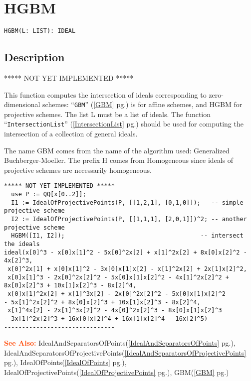 \documentclass[a4paper]{mybook}
\newenvironment{command}{}{} %
\newcommand\SeeAlso{\par\textcolor{OrangeRed}{\textbf{\large See Also: }}}
\begin{document}
\section{HGBM}
\label{HGBM}
\begin{command} %


\begin{Verbatim}[label=syntax, rulecolor=\color{MidnightBlue},
frame=single]
HGBM(L: LIST): IDEAL
\end{Verbatim}


\subsection*{Description}

***** NOT YET IMPLEMENTED *****
\par 
This function computes the intersection of ideals corresponding to
zero-dimensional schemes: ``\verb&GBM&'' (\ref{GBM} pg.\pageref{GBM}) is for affine schemes, and HGBM for
projective schemes.  The list L must be a list of ideals.  The function
``\verb&IntersectionList&'' (\ref{IntersectionList} pg.\pageref{IntersectionList}) should be used for computing the intersection of a
collection of general ideals.
\par 
The name GBM comes from the name of the algorithm used: Generalized
Buchberger-Moeller.  The prefix H comes from Homogeneous since ideals
of projective schemes are necessarily homogeneous.
\begin{Verbatim}[label=example, rulecolor=\color{PineGreen}, frame=single]
***** NOT YET IMPLEMENTED *****
  use P := QQ[x[0..2]];
  I1 := IdealOfProjectivePoints(P, [[1,2,1], [0,1,0]]);   -- simple projective scheme
  I2 := IdealOfProjectivePoints(P, [[1,1,1], [2,0,1]])^2; -- another projective scheme
  HGBM([I1, I2]);                                      -- intersect the ideals
ideal(x[0]^3 - x[0]x[1]^2 - 5x[0]^2x[2] + x[1]^2x[2] + 8x[0]x[2]^2 - 4x[2]^3,
 x[0]^2x[1] + x[0]x[1]^2 - 3x[0]x[1]x[2] - x[1]^2x[2] + 2x[1]x[2]^2,
 x[0]x[1]^3 - 2x[0]^2x[2]^2 - 5x[0]x[1]x[2]^2 - 4x[1]^2x[2]^2 +
8x[0]x[2]^3 + 10x[1]x[2]^3 - 8x[2]^4,
 x[0]x[1]^2x[2] + x[1]^3x[2] - 2x[0]^2x[2]^2 - 5x[0]x[1]x[2]^2
- 5x[1]^2x[2]^2 + 8x[0]x[2]^3 + 10x[1]x[2]^3 - 8x[2]^4,
 x[1]^4x[2] - 2x[1]^3x[2]^2 - 4x[0]^2x[2]^3 - 8x[0]x[1]x[2]^3
- 3x[1]^2x[2]^3 + 16x[0]x[2]^4 + 16x[1]x[2]^4 - 16x[2]^5)
-------------------------------
\end{Verbatim}


\SeeAlso %
  IdealAndSeparatorsOfPoints(\ref{IdealAndSeparatorsOfPoints} pg.\pageref{IdealAndSeparatorsOfPoints}), 
    IdealAndSeparatorsOfProjectivePoints(\ref{IdealAndSeparatorsOfProjectivePoints} pg.\pageref{IdealAndSeparatorsOfProjectivePoints}), 
    IdealOfPoints(\ref{IdealOfPoints} pg.\pageref{IdealOfPoints}), 
    IdealOfProjectivePoints(\ref{IdealOfProjectivePoints} pg.\pageref{IdealOfProjectivePoints}), 
    GBM(\ref{GBM} pg.\pageref{GBM})
\end{command} %
\end{document}
